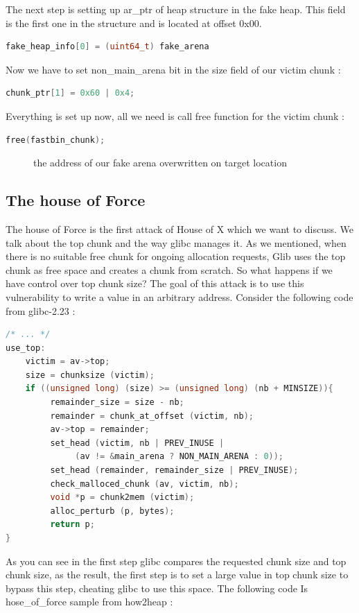 \documentclass{masterthesis}
\newcommand*\libc{glibc}
\begin{document}
The next step is setting up ar\_ptr of heap structure in the fake heap. This field is the first one in the structure and is located at offset 0x00. 

\begin{lstlisting}[language=c,frame=tlrb]
fake_heap_info[0] = (uint64_t) fake_arena
\end{lstlisting}

Now we have to set non\_main\_arena bit in the size field of our victim chunk :

\begin{lstlisting}[language=c,frame=tlrb]
chunk_ptr[1] = 0x60 | 0x4;
\end{lstlisting}

Everything is set up now, all we need is call free function for the victim chunk :

\begin{lstlisting}[language=c,frame=tlrb]
free(fastbin_chunk); 
\end{lstlisting}

\begin{figure}[h!]
  \caption{the address of our fake arena overwritten on target location}
\end{figure}

\subsection{The house of Force}
The house of Force is the first attack of House of X which we want to discuss. We talk about the top chunk and the way \libc{} manages it. As we mentioned, when there is no suitable free chunk for ongoing allocation requests, Glib uses the top chunk as free space and creates a chunk from scratch. So what happens if we have control over top chunk size? The goal of this attack is to use this vulnerability to write a value in an arbitrary address. Consider the following code from \libc{-2.23} :
\begin{lstlisting}[language=c,frame=tlrb]
 /* ... */ 
use_top:
	victim = av->top;
	size = chunksize (victim);
	if ((unsigned long) (size) >= (unsigned long) (nb + MINSIZE)){
	     remainder_size = size - nb;
	     remainder = chunk_at_offset (victim, nb);
	     av->top = remainder;
	     set_head (victim, nb | PREV_INUSE |
	          (av != &main_arena ? NON_MAIN_ARENA : 0));
	     set_head (remainder, remainder_size | PREV_INUSE);
	     check_malloced_chunk (av, victim, nb);
	     void *p = chunk2mem (victim);
	     alloc_perturb (p, bytes);
	     return p;
}
\end{lstlisting}
As you can see in the first step \libc{} compares the requested chunk size and top chunk size, as the result, the first step is to set a large value in top chunk size to bypass this step, cheating \libc{} to use this space. The following code Is hose\_of\_force sample from how2heap :
\end{document}
